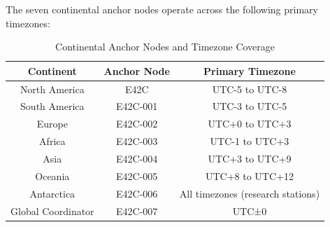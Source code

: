 \documentclass[12pt]{article}
\begin{document}
The seven continental anchor nodes operate across the following primary timezones:

\begin{table}[h]
\centering
\begin{tabular}{|c|c|c|}
\hline
\textbf{Continent} & \textbf{Anchor Node} & \textbf{Primary Timezone} \\
\hline
North America & E42C & UTC-5 to UTC-8 \\
\hline
South America & E42C-001 & UTC-3 to UTC-5 \\
\hline
Europe & E42C-002 & UTC+0 to UTC+3 \\
\hline
Africa & E42C-003 & UTC-1 to UTC+3 \\
\hline
Asia & E42C-004 & UTC+3 to UTC+9 \\
\hline
Oceania & E42C-005 & UTC+8 to UTC+12 \\
\hline
Antarctica & E42C-006 & All timezones (research stations) \\
\hline
Global Coordinator & E42C-007 & UTC±0 \\
\hline
\end{tabular}
\caption{Continental Anchor Nodes and Timezone Coverage}
\end{table}
\end{document}
